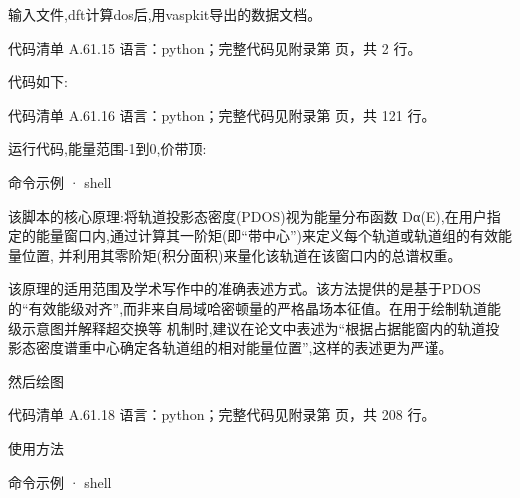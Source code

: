 \documentclass[lang=cn,scheme=chinese,color=blue,device=normal,toc=onecol,math=cm]{elegantbook}
\begin{document}
输入文件,dft计算dos后,用vaspkit导出的数据文档。\par


\begin{codeindexbox}{代码清单 A.61.15}
语言：python；完整代码见附录第 \pageref{code:61:15} 页，共 2 行。
\end{codeindexbox}


代码如下:\par


\begin{codeindexbox}{代码清单 A.61.16}
语言：python；完整代码见附录第 \pageref{code:61:16} 页，共 121 行。
\end{codeindexbox}


运行代码,能量范围-1到0,价带顶:\par


\begin{inlinecodebox}{命令示例 · shell}
\end{inlinecodebox}


该脚本的核心原理:将轨道投影态密度(PDOS)视为能量分布函数 Dα(E),在用户指定的能量窗口内,通过计算其一阶矩(即“带中心”)来定义每个轨道或轨道组的有效能量位置, 并利用其零阶矩(积分面积)来量化该轨道在该窗口内的总谱权重。\par


该原理的适用范围及学术写作中的准确表述方式。该方法提供的是基于PDOS的“有效能级对齐”,而非来自局域哈密顿量的严格晶场本征值。在用于绘制轨道能级示意图并解释超交换等 机制时,建议在论文中表述为“根据占据能窗内的轨道投影态密度谱重中心确定各轨道组的相对能量位置”,这样的表述更为严谨。\par


然后绘图\par


\begin{codeindexbox}{代码清单 A.61.18}
语言：python；完整代码见附录第 \pageref{code:61:18} 页，共 208 行。
\end{codeindexbox}


使用方法\par


\begin{inlinecodebox}{命令示例 · shell}
\end{inlinecodebox}
\end{document}
